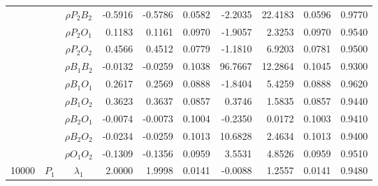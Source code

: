 \documentclass[letterpaper]{article}
\begin{document}
\begin{table}[h]
\begin{tabular}{cccrrrrrrr}
            &             & $\rho{P_2B_2}$ & -0.5916                & -0.5786                & 0.0582                 & -2.2035                & 22.4183                & 0.0596                   & 0.9770                 \\
            &             & $\rho{P_2O_1}$ & 0.1183                 & 0.1161                 & 0.0970                 & -1.9057                & 2.3253                 & 0.0970                   & 0.9540                 \\
            &             & $\rho{P_2O_2}$ & 0.4566                 & 0.4512                 & 0.0779                 & -1.1810                & 6.9203                 & 0.0781                   & 0.9500                 \\
            &             & $\rho{B_1B_2}$ & -0.0132                & -0.0259                & 0.1038                 & 96.7667                & 12.2864                & 0.1045                   & 0.9300                 \\
            &             & $\rho{B_1O_1}$ & 0.2617                 & 0.2569                 & 0.0888                 & -1.8404                & 5.4259                 & 0.0888                   & 0.9620                 \\
            &             & $\rho{B_1O_2}$ & 0.3623                 & 0.3637                 & 0.0857                 & 0.3746                 & 1.5835                 & 0.0857                   & 0.9440                 \\
            &             & $\rho{B_2O_1}$ & -0.0074                & -0.0073                & 0.1004                 & -0.2350                & 0.0172                 & 0.1003                   & 0.9410                 \\
            &             & $\rho{B_2O_2}$ & -0.0234                & -0.0259                & 0.1013                 & 10.6828                & 2.4634                 & 0.1013                   & 0.9400                 \\
            &             & $\rho{O_1O_2}$ & -0.1309                & -0.1356                & 0.0959                 & 3.5531                 & 4.8526                 & 0.0959                   & 0.9510                 \\\hline
10000       & $P_1$       & $\lambda_1$    & 2.0000                 & 1.9998                 & 0.0141                 & -0.0088                & 1.2557                 & 0.0141                   & 0.9480                 \\

\end{tabular}
\end{table}
\end{document}
